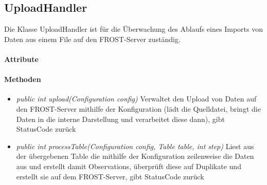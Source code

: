 \subsection{UploadHandler}
Die Klasse UploadHandler ist für die Überwachung des Ablaufs eines Imports von Daten aus einem File auf den FROST-Server zuständig.

\paragraph{Attribute}
\paragraph{Methoden}
\begin{itemize}
\item \textit{public int upload(Configuration config)} Verwaltet den Upload von Daten auf den FROST-Server mithilfe der Konfiguration (lädt die Quelldatei, bringt die Daten in die interne Darstellung und verarbeitet diese dann), gibt StatusCode zurück
\item \textit{public int processTable(Configuration config, Table table, int step)} Liest aus der übergebenen Table die mithilfe der Konfiguration zeilenweise die Daten aus und erstellt damit Observations, überprüft diese auf Duplikate und erstellt sie auf dem FROST-Server, gibt StatusCode zurück
\end{itemize}